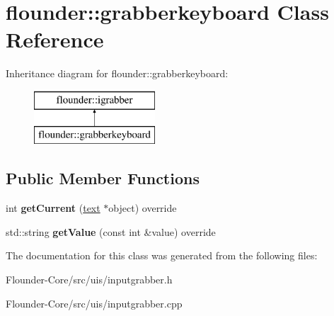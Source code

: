 \hypertarget{classflounder_1_1grabberkeyboard}{}\section{flounder\+:\+:grabberkeyboard Class Reference}
\label{classflounder_1_1grabberkeyboard}
Inheritance diagram for flounder\+:\+:grabberkeyboard\+:\begin{figure}[H]
\begin{center}
\leavevmode
\includegraphics[height=2.000000cm]{classflounder_1_1grabberkeyboard}
\end{center}
\end{figure}
\subsection*{Public Member Functions}
\begin{DoxyCompactItemize}
\item 
\mbox{\label{classflounder_1_1grabberkeyboard_a5b60f06cd5a18cd8b66888c6796064a2}} 
int {\bfseries get\+Current} (\hyperlink{classflounder_1_1text}{text} $\ast$object) override
\item 
\mbox{\label{classflounder_1_1grabberkeyboard_ae45f2c235bbca57be99b9e571aeae176}} 
std\+::string {\bfseries get\+Value} (const int \&value) override
\end{DoxyCompactItemize}


The documentation for this class was generated from the following files\+:\begin{DoxyCompactItemize}
\item 
Flounder-\/\+Core/src/uis/inputgrabber.\+h\item 
Flounder-\/\+Core/src/uis/inputgrabber.\+cpp\end{DoxyCompactItemize}
